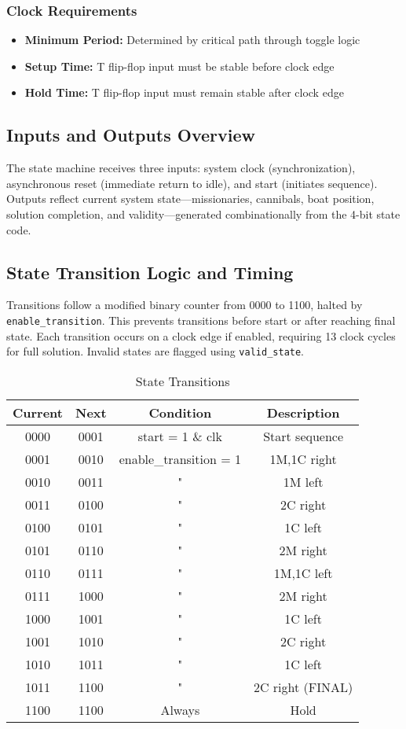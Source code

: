 \documentclass[10pt,a4paper]{article}
\begin{document}
\subsubsection*{Clock Requirements}
\begin{itemize}
    \item \textbf{Minimum Period:} Determined by critical path through toggle logic
    \item \textbf{Setup Time:} T flip-flop input must be stable before clock edge
    \item \textbf{Hold Time:} T flip-flop input must remain stable after clock edge
\end{itemize}

\subsection*{Inputs and Outputs Overview}

The state machine receives three inputs: system clock (synchronization), asynchronous reset (immediate return to idle), and start (initiates sequence). Outputs reflect current system state—missionaries, cannibals, boat position, solution completion, and validity—generated combinationally from the 4-bit state code.

\subsection*{State Transition Logic and Timing}

Transitions follow a modified binary counter from 0000 to 1100, halted by \texttt{enable\_transition}. This prevents transitions before start or after reaching final state. Each transition occurs on a clock edge if enabled, requiring 13 clock cycles for full solution. Invalid states are flagged using \texttt{valid\_state}.

\begin{table}[H]
\centering
\begin{tabular}{|c|c|c|c|}
\hline
\textbf{Current} & \textbf{Next} & \textbf{Condition} & \textbf{Description} \\
\hline
0000 & 0001 & start = 1 \& clk & Start sequence \\
0001 & 0010 & enable\_transition = 1 & 1M,1C right \\
0010 & 0011 & " & 1M left \\
0011 & 0100 & " & 2C right \\
0100 & 0101 & " & 1C left \\
0101 & 0110 & " & 2M right \\
0110 & 0111 & " & 1M,1C left \\
0111 & 1000 & " & 2M right \\
1000 & 1001 & " & 1C left \\
1001 & 1010 & " & 2C right \\
1010 & 1011 & " & 1C left \\
1011 & 1100 & " & 2C right (FINAL) \\
1100 & 1100 & Always & Hold \\
\hline
\end{tabular}
\caption{State Transitions}
\end{table}
\end{document}
